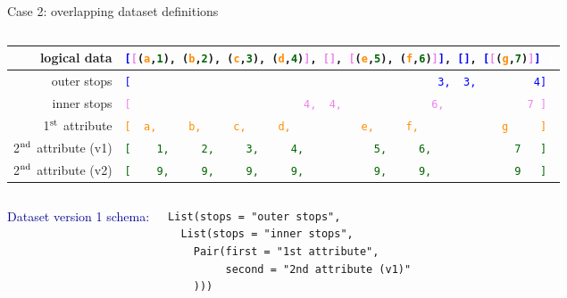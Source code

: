 \documentclass[aspectratio=169]{beamer}
\begin{document}
\begin{frame}[fragile]{Case 2: overlapping dataset definitions}
\vspace{1 cm}

\begin{columns}
\begin{tabular}{r l}
\small logical data & {\tt\scriptsize \textcolor{blue}{[}\textcolor{violet}{[}(\textcolor{darkorange}{a},\textcolor{darkgreen}{1}), (\textcolor{darkorange}{b},\textcolor{darkgreen}{2}), (\textcolor{darkorange}{c},\textcolor{darkgreen}{3}), (\textcolor{darkorange}{d},\textcolor{darkgreen}{4})\textcolor{violet}{]}, \textcolor{violet}{[]}, \textcolor{violet}{[}(\textcolor{darkorange}{e},\textcolor{darkgreen}{5}), (\textcolor{darkorange}{f},\textcolor{darkgreen}{6})\textcolor{violet}{]}\textcolor{blue}{]}, \textcolor{blue}{[]}, \textcolor{blue}{[}\textcolor{violet}{[}(\textcolor{darkorange}{g},\textcolor{darkgreen}{7})\textcolor{violet}{]}\textcolor{blue}{]}\ \textcolor{white}{]}} \\\hline
\small outer stops & {\tt\scriptsize \textcolor{blue}{[\ \ \ \ \ \ \ \ \ \ \ \ \ \ \ \ \ \ \ \ \ \ \ \ \ \ \ \ \ \ \ \ \ \ \ \ \ \ \ \ \ \ \ \ \ \ \ \ 3,\ \ 3,\ \ \ \ \ \ \ \ \ 4]}} \\
\small inner stops & {\tt\scriptsize \textcolor{violet}{[\ \ \ \ \ \ \ \ \ \ \ \ \ \ \ \ \ \ \ \ \ \ \ \ \ \ \ 4,\ \ 4,\ \ \ \ \ \ \ \ \ \ \ \ \ \ 6,\ \ \ \ \ \ \ \ \ \ \ \ \ 7\ ]}} \\
\small 1$^{\mbox{\scriptsize st}}$ attribute & {\tt\scriptsize \textcolor{darkorange}{[\ \ a,\ \ \ \ \ b,\ \ \ \ \ c,\ \ \ \ \ d,\ \ \ \ \ \ \ \ \ \ \ e,\ \ \ \ \ f,\ \ \ \ \ \ \ \ \ \ \ \ \ g\ \ \ \ \ ]}} \\
\small 2$^{\mbox{\scriptsize nd}}$ attribute (v1) & {\tt\scriptsize \textcolor{darkgreen}{[\ \ \ \ 1,\ \ \ \ \ 2,\ \ \ \ \ 3,\ \ \ \ \ 4,\ \ \ \ \ \ \ \ \ \ \ 5,\ \ \ \ \ 6,\ \ \ \ \ \ \ \ \ \ \ \ \ 7\ \ \ ]}} \\
\small 2$^{\mbox{\scriptsize nd}}$ attribute (v2) & {\tt\scriptsize \textcolor{darkgreen}{[\ \ \ \ 9,\ \ \ \ \ 9,\ \ \ \ \ 9,\ \ \ \ \ 9,\ \ \ \ \ \ \ \ \ \ \ 9,\ \ \ \ \ 9,\ \ \ \ \ \ \ \ \ \ \ \ \ 9\ \ \ ]}}
\end{tabular}
\end{columns}

\vspace{0.5 cm}
\begin{columns}[t]
\textcolor{darkblue}{Dataset version 1 schema:}
{\scriptsize
\begin{verbatim}
List(stops = "outer stops",
  List(stops = "inner stops",
    Pair(first = "1st attribute",
         second = "2nd attribute (v1)"
    )))
\end{verbatim}}


\end{columns}
\end{frame}
\end{document}
